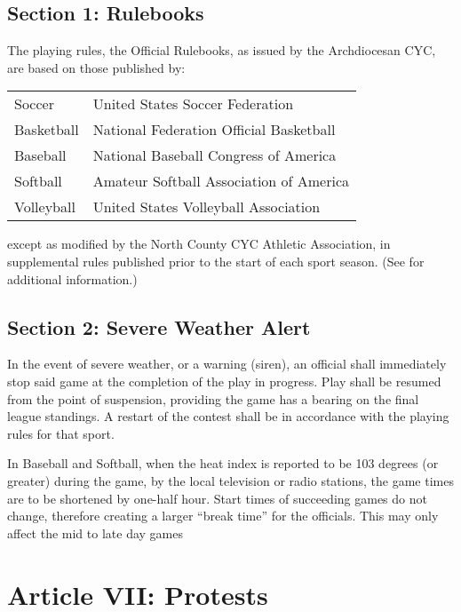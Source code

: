 \subsection{Section 1: Rulebooks}
\label{ssec:const-6-1}
The playing rules, the Official Rulebooks, as issued by the Archdiocesan CYC, are based on those published by:
\begin{center}
    \begin{tabular}{l l}
        Soccer & United States Soccer Federation \\
        Basketball & National Federation Official Basketball \\
        Baseball & National Baseball Congress of America \\
        Softball & Amateur Softball Association of America \\
        Volleyball & United States Volleyball Association \\
    \end{tabular}
\end{center}
except as modified by the North County CYC Athletic Association, in supplemental rules published prior to the start of each sport season. (See  for additional information.)

\subsection{Section 2: Severe Weather Alert}
\label{ssec:const-6-2}
In the event of severe weather, or a warning (siren), an official shall immediately stop said game at the completion of the play in progress.  Play shall be resumed from the point of suspension, providing the game has a bearing on the final league standings. A restart of the contest shall be in accordance with the playing rules for that sport. 

In Baseball and Softball, when the heat index is reported to be 103 degrees (or greater) during the game, by the local television or radio stations, the game times are to be shortened by one-half hour. Start times of succeeding games do not change, therefore creating a larger ``break time'' for the officials. This may only affect the mid to late day games

\section{Article VII: Protests}
\label{sec:const-7}
